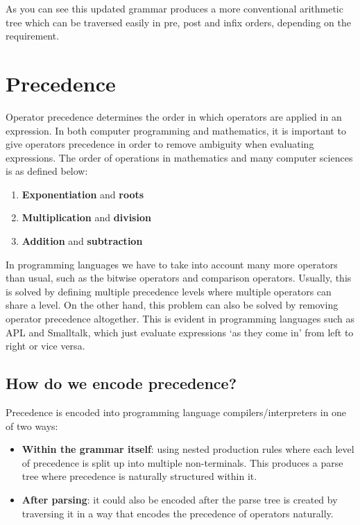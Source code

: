 As you can see this updated grammar produces a more conventional arithmetic tree which can be traversed easily in pre, post and infix orders, depending on the requirement.

\section{Precedence}
\label{sec:precedence}

Operator precedence determines the order in which operators are applied in an expression. In both computer programming and mathematics, it is important to give operators precedence in order to remove ambiguity when evaluating expressions. The order of operations in mathematics and many computer sciences is as defined below:

\begin{center}
    \begin{enumerate}
        \item \textbf{Exponentiation} and \textbf{roots}
        \item \textbf{Multiplication} and \textbf{division}
        \item \textbf{Addition} and \textbf{subtraction}
    \end{enumerate}
\end{center}

In programming languages we have to take into account many more operators than usual, such as the bitwise operators and comparison operators. Usually, this is solved by defining multiple precedence levels where multiple operators can share a level. On the other hand, this problem can also be solved by removing operator precedence altogether. This is evident in programming languages such as APL and Smalltalk, which just evaluate expressions `as they come in' from left to right or vice versa.\textsuperscript{\cite{winkle_2021}}

\subsection{How do we encode precedence?}

Precedence is encoded into programming language compilers/interpreters in one of two ways:

\begin{itemize}
    \item \textbf{Within the grammar itself}: using nested production rules where each level of precedence is split up into multiple non-terminals. This produces a parse tree where precedence is naturally structured within it.
    \item \textbf{After parsing}: it could also be encoded after the parse tree is created by traversing it in a way that encodes the precedence of operators naturally.
\end{itemize}

